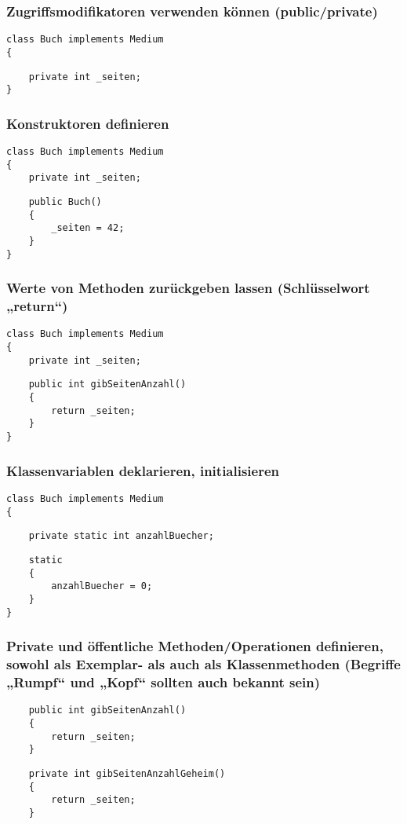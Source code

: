 \documentclass[mathserif]{beamer}
\begin{document}
\begin{frame}[fragile]
\frametitle{Zugriffsmodifikatoren verwenden k\"onnen (public/private)}
    \begin{lstlisting}
class Buch implements Medium 
{
    \end{lstlisting}
\pause
    \begin{lstlisting}
    private int _seiten;
}
    \end{lstlisting}
\end{frame}

\begin{frame}[fragile]
\frametitle{Konstruktoren definieren}
    \begin{lstlisting}
class Buch implements Medium 
{
    private int _seiten;
    \end{lstlisting}
\pause
    \begin{lstlisting}
    public Buch()
    {
        _seiten = 42;
    }
}
    \end{lstlisting}
\end{frame}

\begin{frame}[fragile]
\frametitle{Werte von Methoden zurückgeben lassen (Schlüsselwort „return“)}
    \begin{lstlisting}
class Buch implements Medium 
{
    private int _seiten;
    \end{lstlisting}
\pause
    \begin{lstlisting}
    public int gibSeitenAnzahl()
    {
        return _seiten;
    }
}
    \end{lstlisting}
\end{frame}

\begin{frame}[fragile]
\frametitle{Klassenvariablen deklarieren, initialisieren}
    \begin{lstlisting}
class Buch implements Medium
{
    \end{lstlisting}
    \pause
    \begin{lstlisting}
    private static int anzahlBuecher;
    \end{lstlisting}
    \pause
    \begin{lstlisting}
    static
    {
        anzahlBuecher = 0;
    }
}
    \end{lstlisting}
\end{frame}

\begin{frame}[fragile]
\frametitle{Private und \"offentliche Methoden/Operationen definieren, sowohl als Exemplar- als auch als Klassenmethoden (Begriffe „Rumpf“ und „Kopf“ sollten auch bekannt sein)}
 \begin{lstlisting}
    public int gibSeitenAnzahl()
    {
        return _seiten;
    }
    \end{lstlisting}
    \pause
     \begin{lstlisting}
    private int gibSeitenAnzahlGeheim()
    {
        return _seiten;
    }
    \end{lstlisting}
\end{frame}
\end{document}

